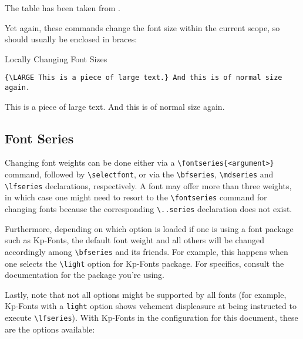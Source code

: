 \documentclass[a4paper,oneside,11pt]{article}
\newcommand\comm[1]{\texttt{\textbackslash#1}}
\newcommand\code[1]{\texttt{#1}}
\begin{document}
The table has been taken from \cite{wikibooks:fonts}.

Yet again, these commands change the font size within the current scope, so should
usually be enclosed in braces:

\begin{titled-frame}
{\textsf{Locally Changing Font Sizes}}
\vspace{-1em}
\begin{verbatim}
{\LARGE This is a piece of large text.} And this is of normal size again.
\end{verbatim}
{\LARGE This is a piece of large text.} And this is of normal size again.
\end{titled-frame}

\subsection{Font Series}
\label{subsec:font-series}

Changing font weights can be done either via a \comm{fontseries\{<argument>\}}
command,   followed  by   \comm{selectfont},  or   via  the   \comm{bfseries},
\comm{mdseries}  and \comm{lfseries}  declarations,  respectively. A font  may
offer more  than three  weights, in  which case  one might  need to  resort to
the  \comm{fontseries} command  for changing  fonts because  the corresponding
\comm{..series} declaration does not exist.

Furthermore,  depending on  which option  is  loaded if  one is  using a  font
package  such as  Kp-Fonts, the  default font  weight and  all others  will be
changed accordingly  among \comm{bfseries} and its  friends. For example, this
happens when  one selects  the \comm{light}  option for  Kp-Fonts package. For
specifics, consult the documentation for the package you're using.

Lastly,  note that  not  all options  might  be supported  by  all fonts  (for
example,  Kp-Fonts  with  a  \code{light} option  shows  vehement  displeasure
at  being  instructed  to   execute  \comm{lfseries}). With  Kp-Fonts  in  the
configuration for this document, these are the options available:
\end{document}
